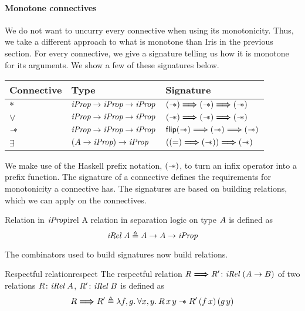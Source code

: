 \documentclass[thesis.tex]{subfiles}
\begin{document}
\paragraph*{Monotone connectives}
We do not want to uncurry every connective when using its monotonicity. Thus, we take a different approach to what is monotone than Iris in the previous section. For every connective, we give a signature telling us how it is monotone for its arguments. We show a few of these signatures below.

\begin{center}
    \begin{tabular}{lll}
        Connective & Type                           & Signature                                           \\
        \hline
        $*$        & $\textit{iProp} \to \textit{iProp} \to \textit{iProp}$    & $(\mathrel{-\!\!\ast}) \mathrel{\bm{\Longrightarrow}} (\mathrel{-\!\!\ast}) \mathrel{\bm{\Longrightarrow}} (\mathrel{-\!\!\ast})$      \\
        $\lor$     & $\textit{iProp} \to \textit{iProp} \to \textit{iProp}$    & $(\mathrel{-\!\!\ast}) \mathrel{\bm{\Longrightarrow}} (\mathrel{-\!\!\ast}) \mathrel{\bm{\Longrightarrow}} (\mathrel{-\!\!\ast})$      \\
        $\mathrel{-\!\!\ast}$    & $\textit{iProp} \to \textit{iProp} \to \textit{iProp}$    & $\bm{\textsf{\upshape flip}}(\mathrel{-\!\!\ast}) \mathrel{\bm{\Longrightarrow}} (\mathrel{-\!\!\ast}) \mathrel{\bm{\Longrightarrow}} (\mathrel{-\!\!\ast})$ \\
        $\exists$  & $(A \to \textit{iProp}) \to \textit{iProp}$ & $((=) \mathrel{\bm{\Longrightarrow}} (\mathrel{-\!\!\ast})) \mathrel{\bm{\Longrightarrow}} (\mathrel{-\!\!\ast})$
    \end{tabular}
\end{center}
We make use of the Haskell prefix notation, $(\mathrel{-\!\!\ast})$, to turn an infix operator into a prefix function. The signature of a connective defines the requirements for monotonicity a connective has. The signatures are based on building relations, which we can apply on the connectives.
\begin{definition}{Relation in $\textit{iProp}$}{irel}
    A relation in separation logic on type $A$ is defined as
    \[\textit{iRel}\ A \triangleq A \to A \to \textit{iProp}\]
\end{definition}
The combinators used to build signatures now build relations.
\begin{definition}{Respectful relation}{respect}
    The respectful relation $\rel \respect \rel'\colon \Rel\ (\sigax\to\sigaxB)$ of two relations $R\colon\textit{iRel}\ A$, $R'\colon\textit{iRel}\ B$ is defined as
    \begin{align*}
        \rel \respect \rel' \eqdef \Lam \func, \funcB. \All \var,\varB. \rel\, \var\, \varB \wand \rel'\, (\func\, \var)\, (\funcB\, \varB)
    \end{align*}
\end{definition}
\end{document}
